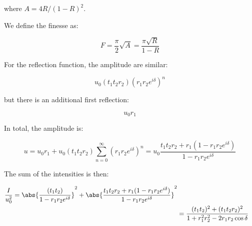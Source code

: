 \documentclass[12pt]{article}
\begin{document}
where $A = 4R/(1 - R)^{2}$.

We define the finesse as:

\begin{equation}
    F = \frac{\pi}{2} \sqrt{A} = \frac{\pi \sqrt{R}}{1 - R}
\end{equation}

For the reflection function, the amplitude are similar:

\begin{equation}
    u_{0} (t_{1} t_{2} r_{2}) (r_{1} r_{2} e^{i \delta})^{n}
\end{equation}

but there is an additional first reflection:

\begin{equation}
    u_{0}r_{1}
\end{equation}

In total, the amplitude is:

\begin{equation}
    u = u_{0} r_{1} + u_{0} (t_{1} t_{2} r_{2}) \sum_{n = 0}^{\infty} (r_{1} r_{2} e^{i \delta})^{n} = u_{0} \frac{t_{1} t_{2} r_{2} + r_{1}(1 - r_{1} r_{2} e^{i \delta})}{1 - r_{1} r_{2} e^{i \delta}}
\end{equation}

The sum of the intensities is then:

\begin{equation}
    \begin{split}
        \frac{I}{u_{0}^{2}} = \abs{\frac{(t_{1} t_{2})}{1 - r_{1} r_{2} e^{i \delta}}}^{2} + \abs{\frac{t_{1} t_{2} r_{2} + r_{1}(1 - r_{1} r_{2} e^{i \delta})}{1 - r_{1} r_{2} e^{i \delta}}}^{2} \\
        &= \frac{(t_{1} t_{2})^{2} + (t_{1} t_{2} r_{2})^{2}}{1 + r_{1}^{2} r_{2}^{2} - 2 r_{1} r_{2} \cos{\delta}} \\
    \end{split}
\end{equation}
\end{document}
